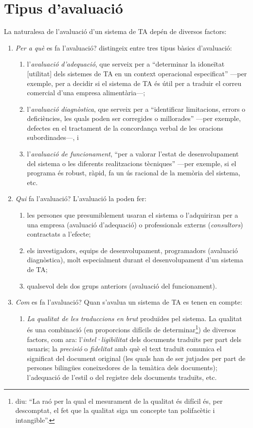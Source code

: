 \section{Tipus d'avaluació}
\label{ss:tipusaval}
La naturalesa de l'avaluació d'un sistema de TA
depén de diversos factors:
\begin{enumerate}
\item \emph{Per a què} es fa l'avaluació? \citet{hutchins96u} distingeix
  entre tres tipus bàsics d'avaluació: 
\begin{enumerate}
\item l'\emph{avaluació d'adequació}, que serveix per a ``determinar
  la idoneïtat [utilitat] dels sistemes de TA en un context
  operacional especificat'' ---per exemple, per a decidir si el
  sistema de TA és útil per a traduir el correu comercial d'una
  empresa alimentària---;
\item l'{\em avaluació diagnòstica}, que serveix per a ``identificar
  limitacions, errors o deficiències, les quals poden ser corregides o
  millorades'' ---per exemple, defectes en el tractament de la
  concordança verbal de les oracions subordinades---, i
\item l'\emph{avaluació de funcionament},  ``per a valorar l'estat de
  desenvolupament del sistema o les diferents realitzacions
  tècniques'' ---per exemple, si el programa és robust,
  ràpid, fa un ús racional de la memòria del sistema, etc.
\end{enumerate}

\item \emph{Qui} fa l'avaluació? L'avaluació la poden fer:
  \begin{enumerate} 
  \item les persones que presumiblement usaran el sistema o
    l'adquiriran per a una empresa (avaluació d'adequació) o
    professionals externs (\emph{consultors}) contractats a l'efecte;
  \item els investigadors, equips de desenvolupament, programadors
    (avaluació diagnòstica), molt especialment durant el
    desenvolupament d'un sistema de TA;
  \item qualsevol dels dos grups anteriors (avaluació del funcionament).
  \end{enumerate}
\item \emph{Com} es fa l'avaluació? Quan s'avalua un sistema de
  TA es tenen en compte:
\begin{enumerate}
\item \emph{La qualitat de les traduccions en brut}
  produïdes pel sistema. La qualitat és una combinació
  (en proporcions difícils de determinar\footnote{\citet{minnis94j}
    diu: ``La raó per la qual el mesurament de la qualitat és
    difícil és, per descomptat, el fet que la qualitat siga
    un concepte tan polifacètic i intangible''.})
  de diversos factors, com ara: 
  l'\emph{intel·ligibilitat} 
  dels documents traduïts per part dels usuaris; 
  la \emph{precisió} o \emph{fidelitat} amb què el text
  traduït comunica el significat del document original (les quals
  han de ser jutjades per part
  de persones bilingües coneixedores de la temàtica dels
  documents); l'adequació de l'estil o del registre dels documents
  traduïts, etc. 


\end{enumerate}
\end{enumerate}
